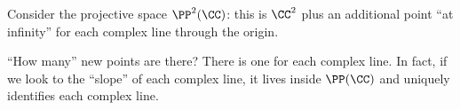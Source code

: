 
\begin{exmp}
	Consider the projective space $\PP^2(\CC)$: this is  $\CC^2$ plus an additional point ``at infinity'' for each complex line through the origin.

	``How many'' new points are there? There is one for each complex line. In fact, if we look to the ``slope'' of each complex line, it lives inside $\PP(\CC)$ and uniquely identifies each complex line.
\end{exmp}

